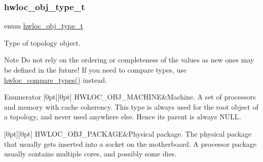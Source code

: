 \subsubsection{\texorpdfstring{hwloc\+\_\+obj\+\_\+type\+\_\+t}{hwloc\_obj\_type\_t}}
{\footnotesize\ttfamily enum \hyperlink{a00184_gacd37bb612667dc437d66bfb175a8dc55}{hwloc\+\_\+obj\+\_\+type\+\_\+t}}



Type of topology object. 

\begin{DoxyNote}{Note}
Do not rely on the ordering or completeness of the values as new ones may be defined in the future! If you need to compare types, use \hyperlink{a00184_ga1820ea0dfd8e9dca28f9ea7624df5ae2}{hwloc\+\_\+compare\+\_\+types()} instead. 
\end{DoxyNote}
\begin{DoxyEnumFields}{Enumerator}
[0pt][0pt]{}\mbox{\label{a00184_ggacd37bb612667dc437d66bfb175a8dc55a3f4e83ffc4a259354959ae8a9eaa2a80}} 
H\+W\+L\+O\+C\+\_\+\+O\+B\+J\+\_\+\+M\+A\+C\+H\+I\+NE&Machine. A set of processors and memory with cache coherency. This type is always used for the root object of a topology, and never used anywhere else. Hence its parent is always {\ttfamily N\+U\+LL}. \\
\hline

[0pt][0pt]{}\mbox{\label{a00184_ggacd37bb612667dc437d66bfb175a8dc55ab16ab8c0dbffc234921d86f3dfb63129}} 
H\+W\+L\+O\+C\+\_\+\+O\+B\+J\+\_\+\+P\+A\+C\+K\+A\+GE&Physical package. The physical package that usually gets inserted into a socket on the motherboard. A processor package usually contains multiple cores, and possibly some dies. \\
\hline


\end{DoxyEnumFields}
